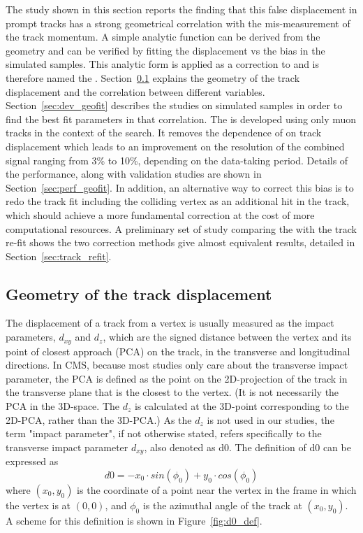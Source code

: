 The study shown in this section reports the finding that this false displacement in prompt tracks
has a strong geometrical correlation with the mis-measurement of the track momentum.
A simple analytic function can be derived from the geometry and can be verified by 
fitting the displacement vs the \pt bias in the simulated samples.
This analytic form is applied as a correction to \pt and is therefore named the \GeoFit.
Section~\ref{sec:d0_geometry} explains the geometry of the track displacement and the correlation between different variables.
Section~\ref{sec:dev_geofit} describes the studies on simulated samples in order to find the best fit parameters in that correlation.
The \GeoFit is developed using only muon tracks in the context of the \hmm search.
It removes the dependence of \mmm on track displacement which leads to an 
improvement on the \mmm resolution of the combined signal ranging from 3\% to 10\%, depending on the data-taking period.
Details of the \GeoFit performance, along with validation studies are shown in Section~\ref{sec:perf_geofit}.
In addition, an alternative way to correct this \pt bias is to redo the track fit including the colliding vertex as an additional hit in the track, 
which should achieve a more fundamental correction at the cost of more computational resources.
A preliminary set of study comparing the \GeoFit with the track re-fit shows the two correction methods give almost equivalent results,
detailed in Section~\ref{sec:track_refit}.


\subsection{Geometry of the track displacement}\label{sec:d0_geometry}

The displacement of a track from a vertex is usually measured as the impact parameters, $d_{xy}$ and $d_{z}$,
which are the signed distance between the vertex and its point of closest approach (PCA) on the track, in the transverse and longitudinal directions.
In CMS, because most studies only care about the transverse impact parameter, 
the PCA is defined as the point on the 2D-projection of the track in the transverse plane that is the closest to the vertex.
(It is not necessarily the PCA in the 3D-space. The $d_{z}$ is calculated at the 3D-point corresponding to the 2D-PCA, rather than the 3D-PCA.)
As the $d_{z}$ is not used in our studies, the term "impact parameter", if not otherwise stated,
refers specifically to the transverse impact parameter $d_{xy}$, also denoted as d0.
The definition of d0 can be expressed as 
\begin{equation}\label{eq:d0_def}
  d0 = -x_{0} \cdot sin(\phi_{0}) + y_{0} \cdot cos(\phi_{0})
\end{equation}
where $(x_{0}, y_{0})$ is the coordinate of a point near the vertex in the frame in which the vertex is at $(0,0)$, 
and $\phi_{0}$ is the azimuthal angle of the track at $(x_{0}, y_{0})$.
A scheme for this definition is shown in Figure~\ref{fig:d0_def}.

